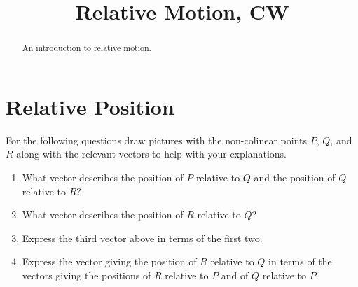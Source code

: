 \documentclass{ximera}
\title{Relative Motion, CW}
\begin{document}
\begin{abstract}
An introduction to relative motion.
\end{abstract}
\maketitle

\section{Relative Position}

\begin{example} \label{Ex:dlfkjef3}
For the following questions draw pictures with the non-colinear points $P$, $Q$, and $R$ along with the relevant vectors to help with your explanations.

\begin{enumerate}
\item What vector describes the position of $P$ relative to $Q$ and the position of $Q$ relative to $R$?

\item What vector describes the position of $R$ relative to $Q$?

\item Express the third vector above in terms of the first two.

\item Express the vector giving the position of $R$ relative to $Q$ in terms of the vectors giving the positions of $R$ relative to $P$ and of $Q$ relative to $P$. 
\end{enumerate}
\end{example}
\end{document}

